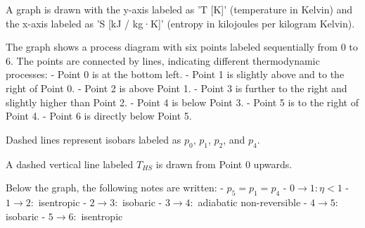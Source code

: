 A graph is drawn with the y-axis labeled as 'T [K]' (temperature in Kelvin) and the x-axis labeled as 'S [kJ / kg·K]' (entropy in kilojoules per kilogram Kelvin).  

The graph shows a process diagram with six points labeled sequentially from 0 to 6. The points are connected by lines, indicating different thermodynamic processes:  
- Point 0 is at the bottom left.  
- Point 1 is slightly above and to the right of Point 0.  
- Point 2 is above Point 1.  
- Point 3 is further to the right and slightly higher than Point 2.  
- Point 4 is below Point 3.  
- Point 5 is to the right of Point 4.  
- Point 6 is directly below Point 5.  

Dashed lines represent isobars labeled as \( p_0 \), \( p_1 \), \( p_2 \), and \( p_4 \).  

A dashed vertical line labeled \( T_{HS} \) is drawn from Point 0 upwards.  

Below the graph, the following notes are written:  
- \( p_5 = p_1 = p_4 \)  
- \( 0 \to 1: \eta < 1 \)  
- \( 1 \to 2: \) isentropic  
- \( 2 \to 3: \) isobaric  
- \( 3 \to 4: \) adiabatic non-reversible  
- \( 4 \to 5: \) isobaric  
- \( 5 \to 6: \) isentropic